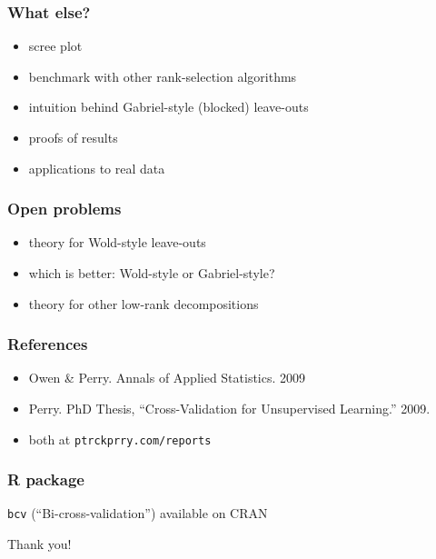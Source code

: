 \documentclass[14pt]{beamer}
\begin{document}
\begin{frame}
  \frametitle{What else?}
  \begin{itemize}
    \item scree plot
    \item benchmark with other rank-selection algorithms
    \item intuition behind Gabriel-style (blocked) leave-outs
    \item proofs of results
    \item applications to real data
  \end{itemize}
\end{frame}

\begin{frame}
  \frametitle{Open problems}
  \begin{itemize}
    \item theory for Wold-style leave-outs
    \item which is better: Wold-style or Gabriel-style?
    \item theory for other low-rank decompositions
  \end{itemize}
\end{frame}

\begin{frame}
  \frametitle{References}
  \begin{itemize}
    \item Owen \& Perry. Annals of Applied Statistics. 2009
    \item Perry. PhD Thesis, ``Cross-Validation for Unsupervised Learning.''
      2009.
    \item both at \texttt{ptrckprry.com/reports}
  \end{itemize}
\end{frame}

\begin{frame}
  \frametitle{R package}
  \texttt{bcv} (``Bi-cross-validation'') available on CRAN
\end{frame}

\begin{frame}
  \centerline{Thank you!}
\end{frame}
\end{document}
